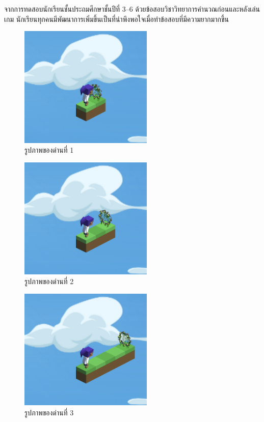 จากการทดสอบนักเรียนชั้นประถมศึกษาชั้นปีที่ 3--6 ด้วยข้อสอบวิชาวิทยาการคำนวณก่อนและหลังเล่นเกม นักเรียนทุกคนมีพัฒนาการเพิ่มขึ้นเป็นที่น่าพึงพอใจเมื่อทำข้อสอบที่มีความยากมากขึ้น
\pagebreak
\begin{figure}[H]
    \begin{center}
    \includegraphics[width=2.5in]{pic-toro/stage/s1.png}
    \end{center}
    \caption[รูปภาพของด่านที่ 1]{รูปภาพของด่านที่ 1}
    \label{s1}
\end{figure}
\begin{figure}[H]
    \begin{center}
    \includegraphics[width=2.5in]{pic-toro/stage/s2.png}
    \end{center}
    \caption[รูปภาพของด่านที่ 2]{รูปภาพของด่านที่ 2}
    \label{s2}
\end{figure}
\begin{figure}[H]
    \begin{center}
    \includegraphics[width=2.5in]{pic-toro/stage/s3.png}
    \end{center}
    \caption[รูปภาพของด่านที่ 3]{รูปภาพของด่านที่ 3}
    \label{s3}
\end{figure}
